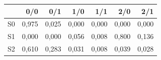 \begin{tabular}{lrrrrrr}
\toprule
 & 0/0 & 0/1 & 1/0 & 1/1 & 2/0 & 2/1 \\
\midrule
S0 & 0,975 & 0,025 & 0,000 & 0,000 & 0,000 & 0,000 \\
S1 & 0,000 & 0,000 & 0,056 & 0,008 & 0,800 & 0,136 \\
S2 & 0,610 & 0,283 & 0,031 & 0,008 & 0,039 & 0,028 \\
\bottomrule
\end{tabular}
